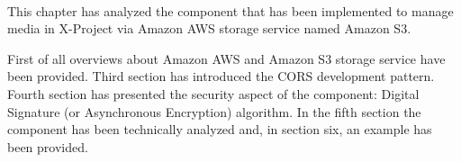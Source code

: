\paragraph{}
This chapter has analyzed the component that has been implemented to manage media in X-Project via Amazon AWS storage service named Amazon S3.

First of all overviews about Amazon AWS and Amazon S3 storage service have been provided. Third section has introduced the CORS development pattern. Fourth section has presented the security aspect of the component: Digital Signature (or Asynchronous Encryption) algorithm. In the fifth section the component has been technically analyzed and, in section six, an example has been provided.